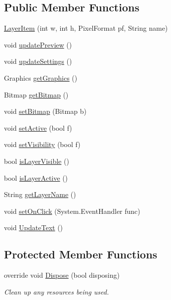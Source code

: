 \subsection*{Public Member Functions}
\begin{DoxyCompactItemize}
\item 
\mbox{\hyperlink{class_paint___program_1_1_layer_item_ad6222eb0d085d1534ea611e9459a8625}{Layer\+Item}} (int w, int h, Pixel\+Format pf, String name)
\item 
void \mbox{\hyperlink{class_paint___program_1_1_layer_item_ae96f2092c93cd2f38cdcf9a923e45ff3}{update\+Preview}} ()
\item 
void \mbox{\hyperlink{class_paint___program_1_1_layer_item_a649977d6df5ecf05e1ddf57ed1724bff}{update\+Settings}} ()
\item 
Graphics \mbox{\hyperlink{class_paint___program_1_1_layer_item_aaaa8ad207673d7db20deb9a084b2a3e3}{get\+Graphics}} ()
\item 
Bitmap \mbox{\hyperlink{class_paint___program_1_1_layer_item_a3055f80c0799ba9d800513881b866f56}{get\+Bitmap}} ()
\item 
void \mbox{\hyperlink{class_paint___program_1_1_layer_item_a0cdb47e3de7f09a88df2a3ee7e3e1f2a}{set\+Bitmap}} (Bitmap b)
\item 
void \mbox{\hyperlink{class_paint___program_1_1_layer_item_af4e60cbe11c705aff29929704c8be6b3}{set\+Active}} (bool f)
\item 
void \mbox{\hyperlink{class_paint___program_1_1_layer_item_ac87042bbaa15bd3c798db8033c6e2b1f}{set\+Visibility}} (bool f)
\item 
bool \mbox{\hyperlink{class_paint___program_1_1_layer_item_a1c0d40a9d83be0d34ec6c9573fc9a8f0}{is\+Layer\+Visible}} ()
\item 
bool \mbox{\hyperlink{class_paint___program_1_1_layer_item_ae6e321929763123db3137f0e23146bbe}{is\+Layer\+Active}} ()
\item 
String \mbox{\hyperlink{class_paint___program_1_1_layer_item_a99f0895f89d20e4d03fd5937a3b7f794}{get\+Layer\+Name}} ()
\item 
void \mbox{\hyperlink{class_paint___program_1_1_layer_item_a862b3f58efec4a13a07c422a5589ba7c}{set\+On\+Click}} (System.\+Event\+Handler func)
\item 
void \mbox{\hyperlink{class_paint___program_1_1_layer_item_a7cbff967883c3895e000050a5c6e2144}{Update\+Text}} ()
\end{DoxyCompactItemize}
\subsection*{Protected Member Functions}
\begin{DoxyCompactItemize}
\item 
override void \mbox{\hyperlink{class_paint___program_1_1_layer_item_a2d910d24422666826cf1d8b14b35c2d8}{Dispose}} (bool disposing)
\begin{DoxyCompactList}\small\item\em Clean up any resources being used. \end{DoxyCompactList}\end{DoxyCompactItemize}
